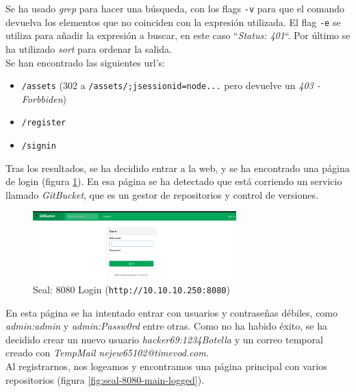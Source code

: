 Se ha usado \textit{grep} para hacer una búsqueda, con los flags \texttt{-v} para que el comando devuelva los elementos que no coinciden con la expresión utilizada. El flag \texttt{-e} se utiliza para añadir la expresión a buscar, en este caso ``\textit{Status: 401}``. Por último se ha utilizado \textit{sort} para ordenar la salida.\\

Se han encontrado las siguientes \acrshort{url}'s:
\begin{itemize}
    \item \texttt{/assets} (302 a \texttt{/assets/;jsessionid=node...} pero devuelve un \textit{403 - Forbbiden})
    \item \texttt{/register}
    \item \texttt{/signin}
\end{itemize}

Tras los resultados, se ha decidido entrar a la web, y se ha encontrado una página de login (figura \ref{fig:seal-8080-main}). En esa página se ha detectado que está corriendo un servicio llamado \textit{GitBucket}\cite{gitbucket}, que es un gestor de repositorios y control de versiones.\\

\begin{figure}[h]
    \centering
    \includegraphics[width=0.70\textwidth]{images/machines/seal/main-page.png}
    \caption{Seal: 8080 Login (\texttt{http://10.10.10.250:8080})}
    \label{fig:seal-8080-main}
\end{figure}

En esta página se ha intentado entrar con usuarios y contraseñas débiles, como \textit{admin:admin} y \textit{admin:Passw0rd} entre otras. Como no ha habido éxito, se ha decidido crear un nuevo usuario \textit{hacker69:1234Botella} y un correo temporal creado con \textit{TempMail}\cite{tempmail} \textit{nejew65102@timevod.com}.\\

Al registrarnos, nos logeamos y encontramos una página principal con varios repositorios (figura \ref{fig:seal-8080-main-logged}).\\

